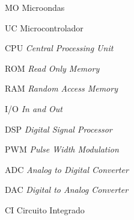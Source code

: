 
\begin{siglas}
    \item[MO] Microondas
    \item[UC] Microcontrolador
    \item[CPU] \textit{Central Processing Unit}
    \item[ROM] \textit{Read Only Memory}
    \item[RAM] \textit{Random Access Memory}
    \item[I/O] \textit{In and Out}
    \item[DSP] \textit{Digital Signal Processor}
    \item[PWM] \textit{Pulse Width Modulation}
    \item[ADC] \textit{Analog to Digital Converter}
    \item[DAC] \textit{Digital to Analog Converter}
    \item[CI] Circuito Integrado
\end{siglas}

